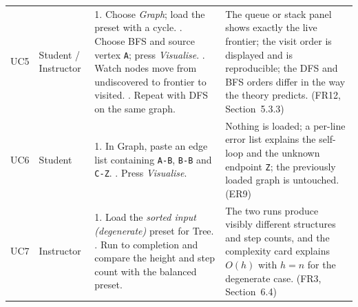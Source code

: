 \documentclass[11pt,a4paper]{article}
\newcommand{\ct}[1]{\texttt{#1}}
\begin{document}
\begin{center}
\begin{longtable}{@{}L{1.1cm}L{1.7cm}L{7.6cm}L{4.7cm}@{}}
UC5 & Student /
Instructor &
1. Choose \emph{Graph}; load the preset with a cycle. . Choose BFS and source vertex \ct{A}; press \emph{Visualise}. . Watch nodes move from undiscovered to frontier to visited. . Repeat with DFS on the same graph. &
The queue or stack panel shows exactly the live frontier; the visit order is displayed and
is reproducible; the DFS and BFS orders differ in the way the theory predicts.
(FR12, Section~5.3.3) \\

UC6 & Student &
1. In Graph, paste an edge list containing \ct{A-B}, \ct{B-B} and \ct{C-Z}. . Press \emph{Visualise}. &
Nothing is loaded; a per-line error list explains the self-loop and the unknown endpoint
\ct{Z}; the previously loaded graph is untouched. (ER9) \\

UC7 & Instructor &
1. Load the \emph{sorted input (degenerate)} preset for Tree. . Run to completion and compare the height and step count with the balanced preset. &
The two runs produce visibly different structures and step counts, and the complexity card
explains $O(h)$ with $h = n$ for the degenerate case. (FR3, Section~6.4) \\
\end{longtable}
\end{center}
\end{document}
